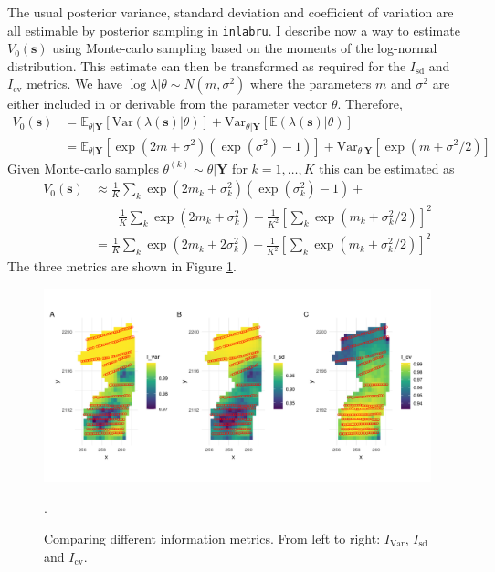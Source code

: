 \documentclass[12pt]{article}
\newcommand{\bm}{\boldsymbol}  %
\newcommand{\bs}{\boldsymbol{s}}
\begin{document}
The usual posterior variance, standard deviation and coefficient of variation are all estimable by posterior sampling in \texttt{inlabru}.  I describe now a way to estimate $V_0(\bs)$ using Monte-carlo sampling based on the moments of the log-normal distribution.  This estimate can then be transformed as required for the $I_{\text{sd}}$ and $I_{\text{cv}}$ metrics.  We have $\log \lambda | \theta \sim N(m, \sigma^2)$ where the parameters $m$ and $\sigma^2$ are either included in or derivable from the parameter vector $\theta$.  Therefore,
\begin{align*}
   V_0(\bs) &= \mathbb{E}_{\theta | \bm{Y}} \left[ \text{Var}(\lambda(\bs) | \theta) \right] + \text{Var}_{\theta | \bm{Y}}\left[\mathbb{E}(\lambda(\bs) | \theta)\right] \\
   &= \mathbb{E}_{\theta | \bm{Y}} \left[ \exp(2m + \sigma^2)(\exp(\sigma^2) - 1) \right] + \text{Var}_{\theta | \bm{Y}}\left[ \exp(m + \sigma^2/2) \right]
\end{align*}
Given Monte-carlo samples $\theta^{(k)} \sim \theta | \bm{Y}$ for $k = 1, \ldots, K$ this can be estimated as
\begin{align*}
V_0(\bs) &\approx \frac{1}{K} \sum_k \exp(2m_k + \sigma^2_k)(\exp(\sigma_k^2) - 1) + \phantom{y} \\ 
&\phantom{\approx} \;\;\frac{1}{K} \sum_k \exp(2m_k + \sigma_k^2) - \frac{1}{K^2}\left[\sum_k \exp(m_k + \sigma_k^2 / 2) \right]^2 \\
&= \frac{1}{K} \sum_k \exp(2m_k + 2\sigma^2_k) - \frac{1}{K^2}\left[\sum_k \exp(m_k + \sigma_k^2 / 2) \right]^2
\end{align*}
The three metrics are shown in Figure \ref{fig:info.png}.
\begin{figure}
	\centering
	\includegraphics[width=\textwidth]{figures/info.png}
	\caption{Comparing different information metrics.  From left to right:  $I_{\text{Var}}$,  $I_{\text{sd}}$ and $I_{\text{cv}}$.}.
	\label{fig:info.png}
\end{figure}
\end{document}
